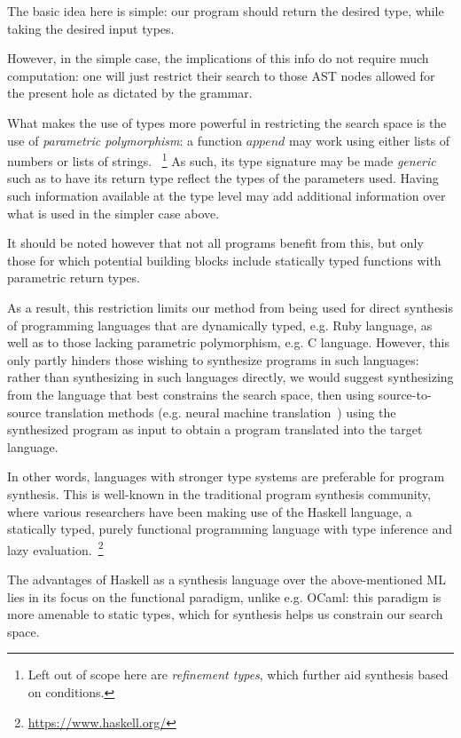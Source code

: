 \documentclass{article}
\begin{document}
The basic idea here is simple: our program should return the desired type, while taking the desired input types.

However, in the simple case, the implications of this info do not require much computation: one will just restrict their search to those AST nodes allowed for the present hole as dictated by the grammar.

What makes the use of types more powerful in restricting the search space is the use of \emph{parametric polymorphism}: a function $append$ may work using either lists of numbers or lists of strings.
~\footnote{Left out of scope here are \emph{refinement types}, which further aid synthesis based on conditions.}
As such, its type signature may be made \emph{generic} such as to have its return type reflect the types of the parameters used. Having such information available at the type level may add additional information over what is used in the simpler case above.

It should be noted however that not all programs benefit from this, but only those for which potential building blocks include statically typed functions with parametric return types.

As a result, this restriction limits our method from being used for direct synthesis of programming languages that are dynamically typed, e.g. Ruby language, as well as to those lacking parametric polymorphism, e.g. C language.
However, this only partly hinders those wishing to synthesize programs in such languages: rather than synthesizing in such languages directly, we would suggest synthesizing from the language that best constrains the search space, then using source-to-source translation methods (e.g. neural machine translation~\citep{kalchbrenner2013recurrent})
using the synthesized program as input to obtain a program translated into the target language.

In other words, languages with stronger type systems are preferable for program synthesis.
This is well-known in the traditional program synthesis community, where various researchers
have been making use of the Haskell language, a statically typed, purely functional programming language with type inference and lazy evaluation.~\footnote{\url{https://www.haskell.org/}}

The advantages of Haskell as a synthesis language over the above-mentioned ML lies in its focus on the functional paradigm, unlike e.g. OCaml: this paradigm is more amenable to static types, which for synthesis helps us constrain our search space.
\end{document}
